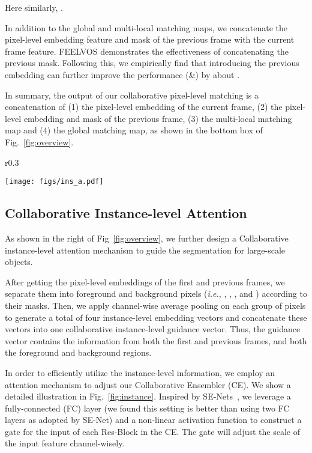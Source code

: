 \documentclass[runningheads]{llncs}
\def\ie{\emph{i.e.}}
\begin{document}
Here similarly, .


In addition to the global and multi-local matching maps, we concatenate the pixel-level embedding feature and mask of the previous frame with the current frame feature. FEELVOS demonstrates the effectiveness of concatenating the previous mask. Following this, we empirically find that introducing the previous embedding can further improve the performance (\&) by about .

In summary, the output of our collaborative pixel-level matching is a concatenation of (1) the pixel-level embedding of the current frame, (2) the pixel-level embedding and mask of the previous frame, (3) the multi-local matching map and (4) the global matching map, as shown in the bottom box of Fig.~\ref{fig:overview}. 

\setlength{\intextsep}{-10pt}
\begin{wrapfigure}[22]{r}{0.3\textwidth}
\center

\texttt{[image: figs/ins\_a.pdf]}

\caption{The trainable part of the instance-level attention.  denotes the channel dimension of pixel-wise embedding. , ,  denote the height, width, channel dimension of CE features.}
\label{fig:instance}

\end{wrapfigure}

\subsection{Collaborative Instance-level Attention}

As shown in the right of Fig~\ref{fig:overview}, we further design a Collaborative instance-level attention mechanism to guide the segmentation for large-scale objects. 

After getting the pixel-level embeddings of the first and previous frames, we separate them into foreground and background pixels (\ie, , , , and ) according to their masks. Then, we apply channel-wise average pooling on each group of pixels to generate a total of four instance-level embedding vectors and concatenate these vectors into one collaborative instance-level guidance vector. Thus, the guidance vector contains the information from both the first and previous frames, and both the foreground and background regions.

\setlength{\intextsep}{0pt}



In order to efficiently utilize the instance-level information, we employ an attention mechanism to adjust our Collaborative Ensembler (CE). We show a detailed illustration in Fig.~\ref{fig:instance}. Inspired by SE-Nets~\cite{senet}, we leverage a fully-connected (FC) layer (we found this setting is better than using two FC layers as adopted by SE-Net) and a non-linear activation function to construct a gate for the input of each Res-Block in the CE. The gate will adjust the scale of the input feature channel-wisely.
\end{document}
